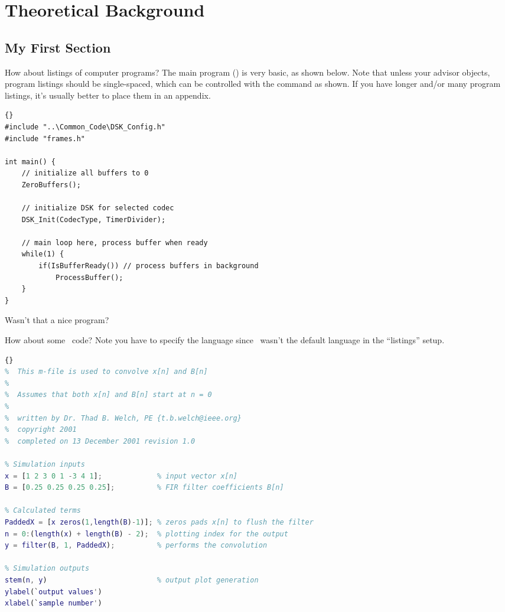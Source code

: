 
\chapter{Theoretical Background}

\section{My First Section}

How about listings of computer programs? The main program
() is very basic, as shown below. Note that unless your
advisor objects, program listings should be single-spaced, which
can be controlled with the \pc{\spacing} command as shown.  If you 
have longer and/or many program listings, it's usually better to 
place them in an appendix.

\begin{spacing}{1}
\begin{lstlisting}[caption={Main program for simple frame-based processing
  using ISRs.},label={cd:FrameMain_isr}]{}
#include "..\Common_Code\DSK_Config.h" 
#include "frames.h"

int main() {
    // initialize all buffers to 0
    ZeroBuffers();

    // initialize DSK for selected codec
    DSK_Init(CodecType, TimerDivider);

    // main loop here, process buffer when ready
    while(1) {
        if(IsBufferReady()) // process buffers in background
            ProcessBuffer();
    }
}
\end{lstlisting}
\end{spacing}
\noindent Wasn't that a nice program?  %

How about some \ml\ code? Note you have to specify the language
since \ml\ wasn't the default language in the ``listings'' setup.

\begin{spacing}{1}
\begin{lstlisting}[language=matlab,%
caption={Simple \ml\ FIR filter example.}]{}
%  This m-file is used to convolve x[n] and B[n]
%
%  Assumes that both x[n] and B[n] start at n = 0
%
%  written by Dr. Thad B. Welch, PE {t.b.welch@ieee.org}
%  copyright 2001
%  completed on 13 December 2001 revision 1.0

% Simulation inputs
x = [1 2 3 0 1 -3 4 1];             % input vector x[n]
B = [0.25 0.25 0.25 0.25];          % FIR filter coefficients B[n]

% Calculated terms
PaddedX = [x zeros(1,length(B)-1)]; % zeros pads x[n] to flush the filter
n = 0:(length(x) + length(B) - 2);  % plotting index for the output
y = filter(B, 1, PaddedX);          % performs the convolution

% Simulation outputs
stem(n, y)                          % output plot generation
ylabel(`output values')
xlabel(`sample number')
\end{lstlisting}
\end{spacing}



